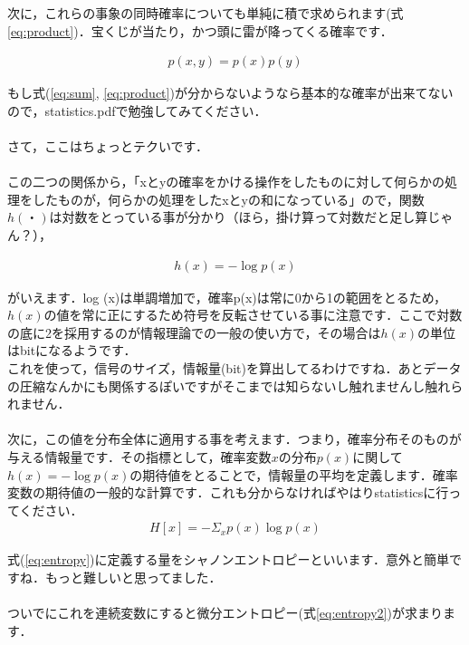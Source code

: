 \documentclass[11pt,a4paper,dvipdfmx]{ujreport}
\begin{document}
次に，これらの事象の同時確率についても単純に積で求められます(式\ref{eq:product})．宝くじが当たり，かつ頭に雷が降ってくる確率です．

\begin{eqnarray}
\label{eq:product}
p(x,y) = p(x)p(y)
\end{eqnarray}

もし式(\ref{eq:sum}, \ref{eq:product})が分からないようなら基本的な確率が出来てないので，statistics.pdfで勉強してみてください．\\
\\
さて，ここはちょっとテクいです．\\
\\
この二つの関係から，「xとyの確率をかける操作をしたものに対して何らかの処理をしたものが，何らかの処理をしたxとyの和になっている」ので，関数$h(・)$は対数をとっている事が分かり（ほら，掛け算って対数だと足し算じゃん？），

\begin{eqnarray}
h(x) = -\log p(x)
\end{eqnarray}

がいえます．log (x)は単調増加で，確率p(x)は常に0から1の範囲をとるため，$h(x)$の値を常に正にするため符号を反転させている事に注意です．ここで対数の底に2を採用するのが情報理論での一般の使い方で，その場合は$h(x)$の単位はbitになるようです．\\

これを使って，信号のサイズ，情報量(bit)を算出してるわけですね．あとデータの圧縮なんかにも関係するぽいですがそこまでは知らないし触れませんし触れられません．\\
\\

次に，この値を分布全体に適用する事を考えます．つまり，確率分布そのものが与える情報量です．その指標として，確率変数$x$の分布$p(x)$に関して$h(x)=-\log p(x)$の期待値をとることで，情報量の平均を定義します．確率変数の期待値の一般的な計算です．これも分からなければやはりstatisticsに行ってください．\\

\begin{eqnarray}
\label{eq:entropy}
H[x] = - \Sigma_{x} p(x) \log p(x)
\end{eqnarray}

式(\ref{eq:entropy})に定義する量をシャノンエントロピーといいます\cite{prml}．意外と簡単ですね．もっと難しいと思ってました．\\
\\

ついでにこれを連続変数にすると微分エントロピー(式\ref{eq:entropy2})が求まります．
\end{document}
